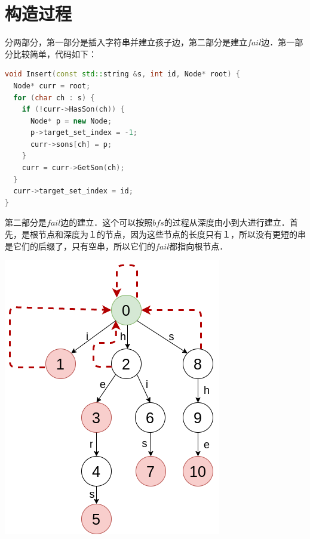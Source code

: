 \documentclass{article}
\begin{document}
\section{构造过程}
分两部分，第一部分是插入字符串并建立孩子边，第二部分是建立$fail$边．第一部分比较简单，代码如下：　\par
\begin{lstlisting}[language=C++, caption={Insert}]
void Insert(const std::string &s, int id, Node* root) {
  Node* curr = root;
  for (char ch : s) {
    if (!curr->HasSon(ch)) {
      Node* p = new Node;
      p->target_set_index = -1;
      curr->sons[ch] = p;
    }
    curr = curr->GetSon(ch);
  }
  curr->target_set_index = id;
}
\end{lstlisting}

第二部分是$fail$边的建立．这个可以按照$bfs$的过程从深度由小到大进行建立．首先，是根节点和深度为１的节点，因为这些节点的长度只有１，所以没有更短的串是它们的后缀了，只有空串，所以它们的$fail$都指向根节点．　\par
\includegraphics[scale=0.5]{pic5.png} \par
\end{document}
